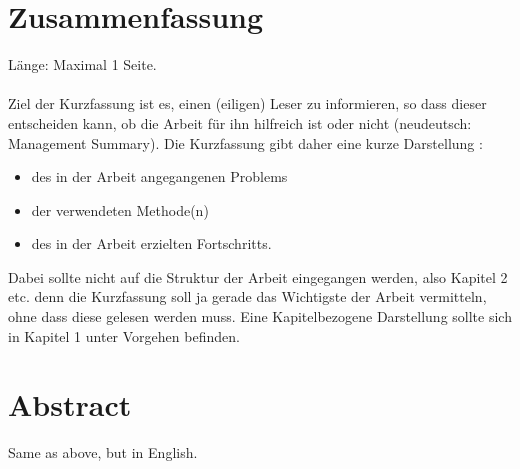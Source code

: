 \chapter*{Zusammenfassung}
Länge: Maximal 1 Seite.\\\\

\noindent Ziel der Kurzfassung ist es, einen (eiligen) Leser zu informieren, so dass dieser entscheiden kann, ob die Arbeit für ihn hilfreich ist oder nicht (neudeutsch: Management Summary). Die Kurzfassung gibt daher eine kurze Darstellung :
\begin{itemize}
	\item des in der Arbeit angegangenen Problems
	\item der verwendeten Methode(n)
	\item des in der Arbeit erzielten Fortschritts. 
\end{itemize}
Dabei sollte nicht auf die Struktur der Arbeit eingegangen werden, also Kapitel 2 etc. denn die Kurzfassung soll ja gerade das Wichtigste der Arbeit vermitteln, ohne dass diese gelesen werden muss. Eine Kapitelbezogene Darstellung sollte sich in Kapitel 1 unter Vorgehen befinden.

\chapter*{Abstract}
Same as above, but in English.




